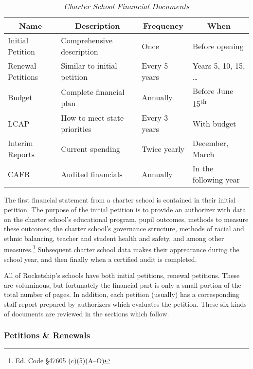 \begin{table}[ht]
  \centering\small%
  \caption[Charter School Financial Documents]{\textit{Charter School Financial Documents}}\label{tab:charter-fin-docs}%
  \begin{tabular}{llll}
    \toprule%
    \multicolumn{1}{c}{Name}  & \multicolumn{1}{c}{Description} & \multicolumn{1}{c}{Frequency} & \multicolumn{1}{c}{When} \\
    \midrule%
    Initial Petition  & Comprehensive description    & Once           & Before opening \\
    Renewal Petitions & Similar to initial petition  & Every 5 years  & Years 5, 10, 15, \ldots \\
    Budget            & Complete financial plan      & Annually       & Before June 15\textsuperscript{th} \\
    LCAP              & How to meet state priorities & Every 3 years  & With budget\\
    Interim Reports   & Current spending             & Twice yearly   & December, March \\
    CAFR              & Audited financials           & Annually       & In the following year \\
    \bottomrule%
  \end{tabular}
\end{table}%

The first financial statement from a charter school is contained in their initial petition. The purpose of the initial petition is to provide an authorizer with data on the charter school's educational program, pupil outcomes, methods to measure these outcomes, the charter school's governance structure, methods of racial and ethnic balancing, teacher and student health and safety, and among other measures.\footnote{Ed. Code §47605 (c)(5)(A–O)} Subsequent charter school data makes their apprearance during the school year, and then finally when a certified audit is completed.

All of Rocketship's schools have both initial petitions, renewal petitions. These are voluminous, but fortunately the financial part is only a small portion of the total number of pages. In addition, each petition (usually) has a corresponding staff report prepared by authorizers which evaluates the petition. These six kinds of documents are reviewed in the sections which follow.

\subsubsection{Petitions \& Renewals}\label{sec:cs-petitions-renewals}\indent


